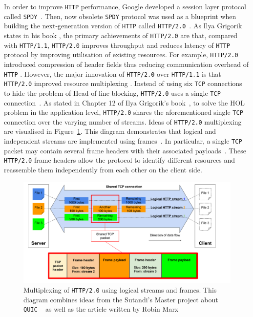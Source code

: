 \documentclass[12pt,a4paper,twoside,openright]{report}
\begin{document}
In order to improve \texttt{HTTP} performance, Google developed a session layer protocol called \texttt{SPDY}~\cite{bib_SPDY_white_paper}.
Then, now obsolete \texttt{SPDY} protocol was used as a blueprint when building the next-generation version of \texttt{HTTP} called \texttt{HTTP/2.0}~\cite{bib_SPDY_vs_HTTP2}.
As Ilya Grigorik states in his book \cite[Chapter~12]{bib_grigorik2013}, the primary achievements of \texttt{HTTP/2.0} are that, compared with \texttt{HTTP/1.1}, \texttt{HTTP/2.0} improves throughput and reduces latency of \texttt{HTTP} protocol by improving utilisation of existing resources.
For example, \texttt{HTTP/2.0} introduced compression of header fields thus reducing communication overhead of \texttt{HTTP} \cite[Chapter~12]{bib_grigorik2013}.
However, the major innovation of \texttt{HTTP/2.0} over \texttt{HTTP/1.1} is that \texttt{HTTP/2.0} improved resource multiplexing \cite[Chapter~12]{bib_grigorik2013}.
Instead of using six \texttt{TCP} connections to hide the problem of Head-of-line blocking, \texttt{HTTP/2.0} uses a single \texttt{TCP} connection~\cite{bib_grigorik2013, head-of-line-blocking-in-quic-and-http-3-the-details}.
As stated in Chapter 12 of Ilya Grigorik's book~\cite{bib_grigorik2013}, to solve the HOL problem in the application level, \texttt{HTTP/2.0} shares the aforementioned single \texttt{TCP} connection over the varying number of streams.
Ideas of \texttt{HTTP/2.0} multiplexing are visualised in Figure~\ref{fig:Multiplexing_HTTP2}.
This diagram demonstrates that logical and independent streams are implemented using frames~\cite{head-of-line-blocking-in-quic-and-http-3-the-details}.
In particular, a single \texttt{TCP} packet may contain several frame headers with their associated payloads~\cite{head-of-line-blocking-in-quic-and-http-3-the-details}.
These \texttt{HTTP/2.0} frame headers allow the protocol to identify different resources and reassemble them independently from each other on the client side.

    \begin{figure}[H]
    \centering
    \includegraphics[width=\textwidth]{figs/Multiplexing_HTTP2.png}
    \caption[Multiplexing of \texttt{HTTP/2.0} using logical streams and frames]{Multiplexing of \texttt{HTTP/2.0} using logical streams and frames. This diagram combines ideas from the Sutandi's Master project about \texttt{QUIC}
   ~\cite{overview_of_the_QUIC_protocol}
    as well as the article written by Robin Marx~\cite{head-of-line-blocking-in-quic-and-http-3-the-details}}
    \label{fig:Multiplexing_HTTP2}
    \end{figure}
    
\end{document}
